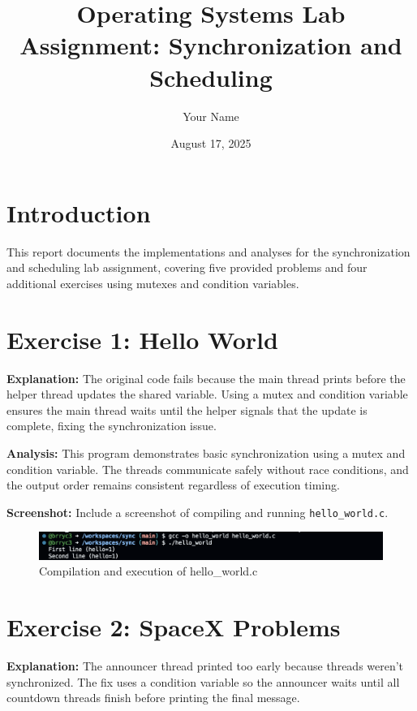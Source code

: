 \documentclass{article}
\begin{document}
\title{Operating Systems Lab Assignment: Synchronization and Scheduling}
\author{Your Name}
\date{August 17, 2025}
\maketitle

\section{Introduction}
This report documents the implementations and analyses for the synchronization and scheduling lab assignment, covering five provided problems and four additional exercises using mutexes and condition variables.

\section{Exercise 1: Hello World}


\textbf{Explanation:} The original code fails because the main thread prints before the helper thread updates the shared variable. Using a mutex and condition variable ensures the main thread waits until the helper signals that the update is complete, fixing the synchronization issue.

\textbf{Analysis:} This program demonstrates basic synchronization using a mutex and condition variable. The threads communicate safely without race conditions, and the output order remains consistent regardless of execution timing.

\textbf{Screenshot:} Include a screenshot of compiling and running \texttt{hello\_world.c}.
\begin{figure}[h]
\centering
\includegraphics[width=\textwidth]{exercise1_screenshot.png}
\caption{Compilation and execution of hello\_world.c}
\end{figure}

\section{Exercise 2: SpaceX Problems}


\textbf{Explanation:} The announcer thread printed too early because threads weren’t synchronized. The fix uses a condition variable so the announcer waits until all countdown threads finish before printing the final message.
\end{document}

